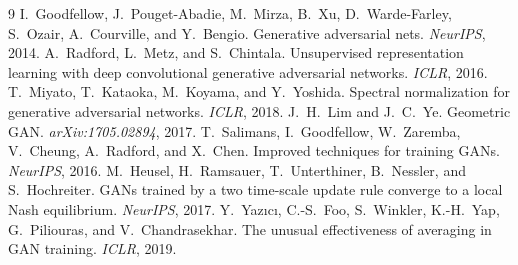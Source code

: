 \documentclass{article}
\begin{document}
{\small
\begin{thebibliography}{9}
 I.~Goodfellow, J.~Pouget-Abadie, M.~Mirza, B.~Xu, D.~Warde-Farley, S.~Ozair, A.~Courville, and Y.~Bengio. Generative adversarial nets. \emph{NeurIPS}, 2014.
 A.~Radford, L.~Metz, and S.~Chintala. Unsupervised representation learning with deep convolutional generative adversarial networks. \emph{ICLR}, 2016.
 T.~Miyato, T.~Kataoka, M.~Koyama, and Y.~Yoshida. Spectral normalization for generative adversarial networks. \emph{ICLR}, 2018.
 J.~H.~Lim and J.~C.~Ye. Geometric GAN. \emph{arXiv:1705.02894}, 2017.
 T.~Salimans, I.~Goodfellow, W.~Zaremba, V.~Cheung, A.~Radford, and X.~Chen. Improved techniques for training GANs. \emph{NeurIPS}, 2016.
 M.~Heusel, H.~Ramsauer, T.~Unterthiner, B.~Nessler, and S.~Hochreiter. GANs trained by a two time-scale update rule converge to a local Nash equilibrium. \emph{NeurIPS}, 2017.
 Y.~Yaz{\i}c{\i}, C.-S.~Foo, S.~Winkler, K.-H.~Yap, G.~Piliouras, and V.~Chandrasekhar. The unusual effectiveness of averaging in GAN training. \emph{ICLR}, 2019.
\end{thebibliography}
}
\end{document}

